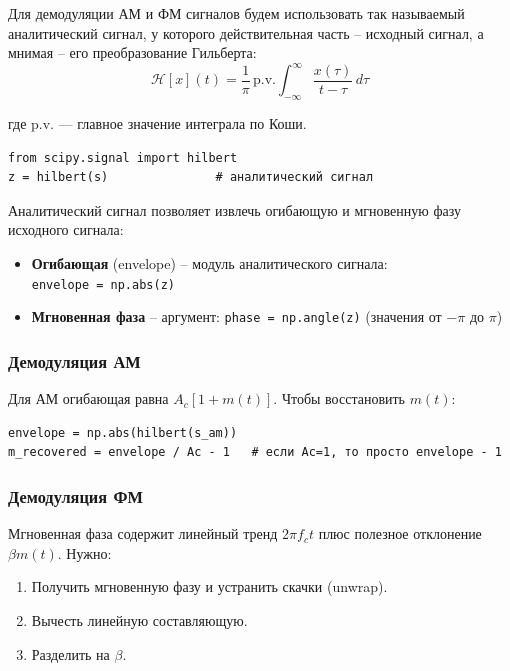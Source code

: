 \documentclass[12pt,a4paper,openany]{book}
\providecommand{\tightlist}{\setlength{\itemsep}{0pt}\setlength{\parskip}{0pt}}
\begin{document}
Для демодуляции АМ и ФМ сигналов будем использовать так называемый аналитический сигнал, у которого действительная часть -- исходный сигнал, а мнимая -- его преобразование Гильберта:
\[
\mathcal{H}[x](t) = \frac{1}{\pi} \,\text{p.v.} \int_{-\infty}^{\infty} \frac{x(\tau)}{t - \tau} \, d\tau
\]

где p.v. --- главное значение интеграла по Коши.

\begin{Verbatim}[fontsize=\small, breaklines, breakanywhere]
from scipy.signal import hilbert
z = hilbert(s)               # аналитический сигнал
\end{Verbatim}

Аналитический сигнал позволяет извлечь огибающую и мгновенную фазу исходного сигнала:

\begin{itemize}
\tightlist
\item
  \textbf{Огибающая} (envelope) -- модуль аналитического сигнала: \texttt{envelope\ =\allowbreak{}\ np.\allowbreak{}abs(\allowbreak{}z)}
\item
  \textbf{Мгновенная фаза} -- аргумент: \texttt{phase\ =\allowbreak{}\ np.\allowbreak{}angle(\allowbreak{}z)} (значения от \(-\pi\) до \(\pi\))
\end{itemize}

\subsubsection*{Демодуляция АМ}

Для АМ огибающая равна \(A_c[1 + m(t)]\). Чтобы восстановить \(m(t)\):

\begin{Verbatim}[fontsize=\small, breaklines, breakanywhere]
envelope = np.abs(hilbert(s_am))
m_recovered = envelope / Ac - 1   # если Ac=1, то просто envelope - 1
\end{Verbatim}

\subsubsection*{Демодуляция ФМ}

Мгновенная фаза содержит линейный тренд \(2\pi f_c t\) плюс полезное отклонение \(\beta m(t)\). Нужно:

\begin{enumerate}
\def\labelenumi{\arabic{enumi}.}
\tightlist
\item
  Получить мгновенную фазу и устранить скачки (unwrap).
\item
  Вычесть линейную составляющую.
\item
  Разделить на \(\beta\).
\end{enumerate}
\end{document}
